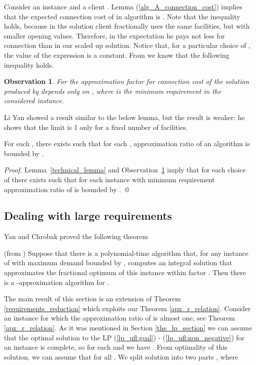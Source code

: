 \documentclass{llncs}
\newtheorem{observation}{\textbf{Observation}}
\begin{document}
Consider an instance  and a client . Lemma (\ref{alg_A_connection_cost}) implies that the expected connection cost of  in algorithm  is . Note that the inequality  holds, because in the solution  client  fractionally uses the same facilities, but with smaller opening values. Therefore, in the expectation he pays not less for connection than in our scaled up solution. Notice that, for a particular choice of , the value of the expression  is a constant. From \cite{Aravind} we know that the following inequality holds. 

\begin{observation}
 \label{nice_observation}
 For  the approximation factor for connection cost of the solution produced by  depends only on , where  is the minimum requirement in the considered instance.
\end{observation}

Li Yan showed \cite{liyan_phd} a result similar to the below lemma, but the result is weaker: he shows that the limit is 1 only for a fixed number of facilities.

\begin{lemma}
\label{1_epsilon}
 For each , there exists  such that for each , approximation ratio of an algorithm  is bounded by .
\end{lemma}

\begin{proof}
 Lemma~\ref{technical_lemma} and Observation~\ref{nice_observation} imply that for each choice of  there exists  such that for each instance with minimum requirement  approximation ratio of  is bounded by .
 \qed
\end{proof}

\subsection{Dealing with large requirements }
Yan and Chrobak proved the following theorem

\begin{theorem} (from \cite{Yan})
\label{requirements_reduction}
 Suppose that there is a polynomial-time algorithm  that, for any instance of  with maximum demand bounded by , computes an integral solution that approximates the fractional optimum of this instance within factor . Then there is a -approximation algorithm  for .
\end{theorem}

The main result of this section is an extension of Theorem \ref{requirements_reduction} which exploits our Theorem \ref{apx_r_relation}. Consider an instance  for which the approximation ratio of  is almost one, see Theorem \ref{apx_r_relation}. As it was mentioned in Section \ref{the_lp_section} we can assume that the optimal solution  to the LP (\ref{lp_ufl:goal}) - (\ref{lp_ufl:non_negative}) for an instance  is complete, so for each  and  we have  . From optimality of this solution, we can assume that  for all . We split solution  into two parts , where 
\end{document}
